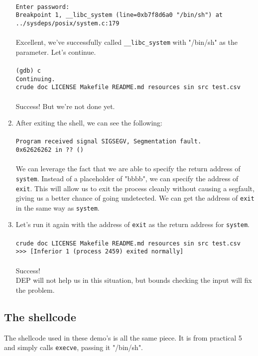 \documentclass[]{article}
\begin{document}
\begin{enumerate}
	\\
	\texttt{Enter password:\\
		Breakpoint 1, \_\_libc\_system (line=0xb7f8d6a0 "/bin/sh") at \\../sysdeps/posix/system.c:179}\\\\
Excellent, we've successfully called \texttt{\_\_libc\_system} with "/bin/sh" as the parameter. Let's continue.\\\\
\texttt{(gdb) c\\
	Continuing.\\
	crude  doc  LICENSE  Makefile  README.md  resources  sin  src  test.csv}
\\
\\
Success! But we're not done yet.
\item After exiting the shell, we can see the following:\\\\
\texttt{Program received signal SIGSEGV, Segmentation fault.\\
	0x62626262 in ?? ()}\\
\\
We can leverage the fact that we are able to specify the return address of \texttt{system}. Instead of a placeholder of "bbbb", we can specify the address of \texttt{exit}. This will allow us to exit the process cleanly without causing a segfault, giving us a better chance of going undetected. We can get the address of \texttt{exit} in the same way as \texttt{system}.
\item Let's run it again with the address of \texttt{exit} as the return address for \texttt{system}.\\\\
\texttt{crude  doc  LICENSE  Makefile  README.md  resources  sin  src  test.csv\\
	>>> [Inferior 1 (process 2459) exited normally]}
\\
\\
Success!
\\
DEP will not help us in this situation, but bounds checking the input will fix the problem.
\end{enumerate}

\subsection*{The shellcode}
The shellcode used in these demo's is all the same piece. It is from practical 5 and simply calls \texttt{execve}, passing it "/bin/sh".
\end{document}
